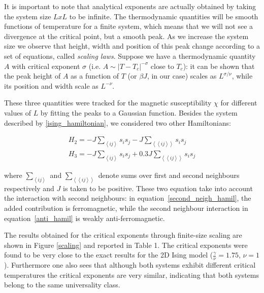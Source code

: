 \documentclass[twoside]{article}
\def\mean#1{\left< #1 \right>}
\begin{document}
\begin{multicols}{2}
It is important to note that analytical exponents are actually obtained by taking the system size $LxL$ to be infinite. The thermodynamic quantities will be smooth functions of temperature for a finite system, which means that we will not see a divergence at the critical point, but a smooth peak. As we increase the system size we observe that height, width and position of this peak change according to a set of equations, called \emph{scaling laws}. Suppose we have a thermodynamic quantity $A$ with critical exponent $\sigma$ (i.e. $A \sim |T-T_c|^{-\sigma}$ close to $T_c$): it can be shown that the peak height of $A$ as a function of $T$ (or $\beta J$, in our case) scales as $L^{\sigma/\nu}$, while its position and width scale as $L^{-\nu}$.

These three quantities were tracked for the magnetic susceptibility $\chi$ for different values of $L$ by fitting the peaks to a Gaussian function. Besides the system described by \eqref{ising_hamiltonian}, we considered two other Hamiltonians:

\begin{align}
\label{second_neigh_hamil}
H_2 = -J\sum_{\mean{ij}} s_i s_j  -J\sum_{\mean{\mean{ij}}} s_i s_j \\
\label{anti_hamil}
H_3 = -J\sum_{\mean{ij}} s_i s_j + 0.3 J \sum_{\mean{\mean{ij}}} s_i s_j 
\end{align}

\noindent where $\sum_{\mean{ij}}$ and $\sum_{\mean{\mean{ij}}}$ denote sums over first and second neighbours respectively and $J$ is taken to be positive. These two equation take into account the interaction with second neighbours: in equation~\ref{second_neigh_hamil}, the added contribution is ferromagnetic, while the second neighbour interaction in equation~\ref{anti_hamil} is weakly anti-ferromagnetic.

The results obtained for the critical exponents through finite-size scaling are shown in Figure \ref{scaling} and reported in Table 1. The critical exponents were found to be very close to the exact results for the 2D Ising model ($\frac{\gamma}{\nu} = 1.75$, $\nu = 1$). Furthermore one also sees that although both systems exhibit different critical temperatures the critical exponents are very similar, indicating that both systems belong to the same universality class.

\noindent {}


\end{multicols}
\end{document}
